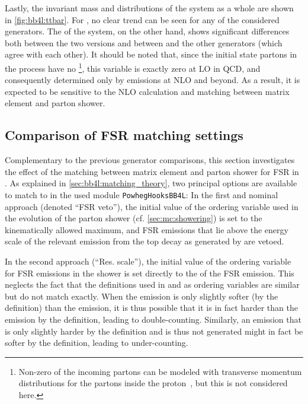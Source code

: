 Lastly, the invariant mass and \pt distributions of the \ttbar system as a whole are shown in \cref{fig:bb4l:ttbar}. For \mtt, no clear trend can be seen for any of the considered generators. The \pt of the \ttbar system, on the other hand, shows significant differences both between the two \bbfourl versions and between \bbfourl and the other generators (which agree with each other). It should be noted that, since the initial state partons in the \pptt process have no \pt\footnote{Non-zero \pt of the incoming partons can be modeled with transverse momentum distributions for the partons inside the proton~\cite{Boer:2011fh}, but this is not considered here.}, this variable is exactly zero at LO in QCD, and consequently determined only by emissions at NLO and beyond. As a result, it is expected to be sensitive to the NLO calculation and matching between matrix element and parton shower.

\subsection{Comparison of FSR matching settings}
\label{sec:bb4l:matching}

Complementary to the previous generator comparisons, this section investigates the effect of the matching between matrix element and parton shower for FSR in \bbfourl. As explained in \cref{sec:bb4l:matching_theory}, two principal options are available to match \bbfourl to \pythia in the used module \texttt{PowhegHooksBB4L}: In the first and nominal approach (denoted ``FSR veto''), the initial value of the ordering variable used in the evolution of the parton shower (cf. \cref{sec:mc:showering}) is set to the kinematically allowed maximum, and FSR emissions that lie above the \powheg energy scale of the relevant emission from the top decay as generated by \powheg are vetoed.

In the second approach (``Res. scale''), the initial value of the ordering variable for FSR emissions in the shower is set directly to the \pt of the \powheg FSR emission. This neglects the fact that the \pt definitions used in \powheg and \pythia as ordering variables are similar but do not match exactly. When the \pythia emission is only slightly softer (by the \pythia definition) than the \powheg emission, it is thus possible that it is in fact harder than the \powheg emission by the \powheg definition, leading to double-counting. Similarly, an emission that is only slightly harder by the \pythia definition and is thus not generated might in fact be softer by the \powheg definition, leading to under-counting.

